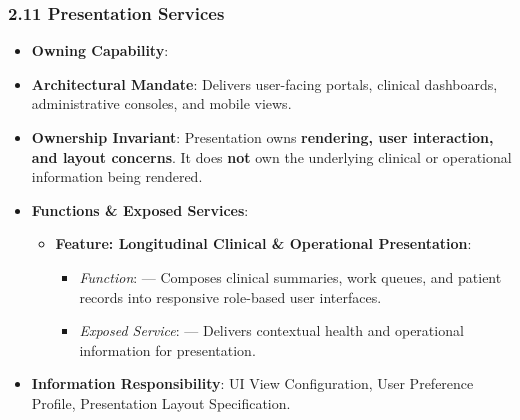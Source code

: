 \par\smallskip
{}\label{rad:ise:214}
\subsubsection*{2.11 Presentation Services}
\label{rad:ise:215}

\begin{itemize}

\item 
\textbf{Owning Capability}: \texttt{}



\item 
\textbf{Architectural Mandate}: Delivers user-facing portals, clinical dashboards, administrative consoles, and mobile views.



\item 
\textbf{Ownership Invariant}: Presentation owns \textbf{rendering, user interaction, and layout concerns}. It does \textbf{not} own the underlying clinical or operational information being rendered.



\item 
\textbf{Functions \& Exposed Services}:


\begin{itemize}

\item 
\textbf{Feature: Longitudinal Clinical \& Operational Presentation}:


\begin{itemize}

\item 
\emph{Function}: \texttt{} — Composes clinical summaries, work queues, and patient records into responsive role-based user interfaces.



\item 
\emph{Exposed Service}: \texttt{} — Delivers contextual health and operational information for presentation.



\end{itemize}


\end{itemize}


\item 
\textbf{Information Responsibility}: UI View Configuration, User Preference Profile, Presentation Layout Specification.



\end{itemize}
\label{rad:ise:224}


